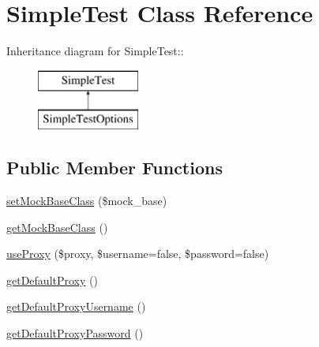 \hypertarget{class_simple_test}{
\section{SimpleTest Class Reference}
\label{class_simple_test}
}
Inheritance diagram for SimpleTest::\begin{figure}[H]
\begin{center}
\leavevmode
\includegraphics[height=2cm]{class_simple_test}
\end{center}
\end{figure}
\subsection*{Public Member Functions}
\begin{DoxyCompactItemize}
\item 
\hyperlink{class_simple_test_a6bfdc0adde3e11f041872bbacd773fdf}{setMockBaseClass} (\$mock\_\-base)
\item 
\hyperlink{class_simple_test_a570025ed110ef875fa426e67acfbd326}{getMockBaseClass} ()
\item 
\hyperlink{class_simple_test_a40777a990732860c647bea8c7aa7f753}{useProxy} (\$proxy, \$username=false, \$password=false)
\item 
\hyperlink{class_simple_test_ad365479a7b328142767560e440f1f2c0}{getDefaultProxy} ()
\item 
\hyperlink{class_simple_test_aabcb9a6457417c17e297d95ca9a1a1db}{getDefaultProxyUsername} ()
\item 
\hyperlink{class_simple_test_a2624d0e6c9d79700b03600fca215e642}{getDefaultProxyPassword} ()
\end{DoxyCompactItemize}
